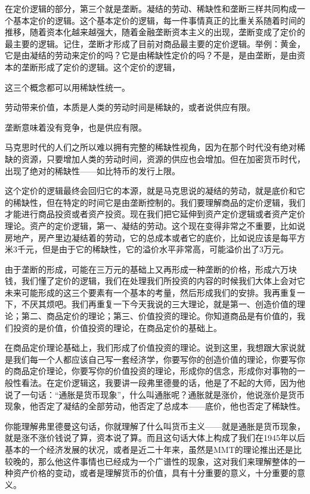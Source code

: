 \documentclass[UTF8, 12pt, a4paper]{ctexrep}
\begin{document}
在定价逻辑的部分，第三个就是垄断。凝结的劳动、稀缺性和垄断三样共同构成一个基本定价的逻辑。这个基本定价的逻辑，每一件事情真正的比重关系随着时间的推移，随着资本化越来越强大，随着金融垄断资本主义的出现，垄断变成了定价的最主要的逻辑。记住，垄断才形成了目前对商品最主要的定价逻辑。举例：黄金，它是由凝结的劳动来定价的吗？它是由稀缺性定价的吗？不是，是由垄断，是由资本的垄断形成了定价的逻辑。这个定价的逻辑，

{\kaishu 这三个概念都可以用稀缺性统一。}

{\kaishu 劳动带来价值，本质是人类的劳动时间是稀缺的，或者说供应有限。}

{\kaishu 垄断意味着没有竞争，也是供应有限。}

{\kaishu 马克思时代的人们之所以难以拥有完整的稀缺性视角，因为在那个时代没有绝对稀缺的资源，只要增加人类的劳动时间，资源的供应也会增加。但在加密货币时代，出现了绝对的稀缺性——如比特币的发行上限。}

这个定价的逻辑最终会回归它的本源，就是马克思说的凝结的劳动，就是底价和它的稀缺性，但在特定的时间它是由垄断控制的。我们要理解商品的定价逻辑，我们才能进行商品投资或者资产投资。现在我们把它延伸到资产定价逻辑或者资产定价理论。资产的定价逻辑，第一、凝结的劳动。这个现在变得非常之不重要，比如说房地产，房产里边凝结着的劳动，它的总成本或者它的底价，比如说应该是每平方米3千元，但是由于它的稀缺性，它的溢价水平非常高，可能溢价出了3万元。

由于垄断的形成，可能在三万元的基础上又再形成一种垄断的价格，形成六万块钱，我们懂了定价的逻辑，我们在处理我们所投资的内容的时候我们大体上会对它未来可能形成的这三个要素有一个基本的考量，然后形成我们的安排。我再重复一下，不厌其烦吧。我们再重复一下今天我说的三大理论，就是第一、创造价值的理论；第二、商品定价的理论；第三、价值投资的理论。你知道商品是有价值的，我们投资的是价值，价值投资的理论，在商品定价的基础上。

在商品定价理论基础上，我们形成了价值投资的理论。说到这里，我想跟大家说就是我们每一个人都应该自己写一套经济学，你要写你的创造价值的理论，你要写你的商品定价理论，你要写你的价值投资的理论，形成你的信念，形成你对事物的一般性看法。在定价逻辑这，我要讲一段弗里德曼的话，他是了不起的大师，因为他说了一句话：“通胀是货币现象”，什么叫通胀呢？通胀就是涨价，他说涨价是货币现象，他否定了凝结的全部劳动，他否定了总成本——底价，他也否定了稀缺性。

你能理解弗里德曼这句话，你就理解了什么叫货币主义——就是通胀是货币现象，就是涨不涨价钱说了算，资本说了算。而且这句话大体上构成了我们在1945年以后基本的一个经济发展的状况，或者是近二十年来，虽然是MMT的理论推出还是比较晚的，那么他这件事情也已经成为一个广谱性的现象，这对我们来理解整体的一种资产价格的变动，或者是理解货币的价值，具有十分重要的意义，十分重要的意义。
\end{document}
